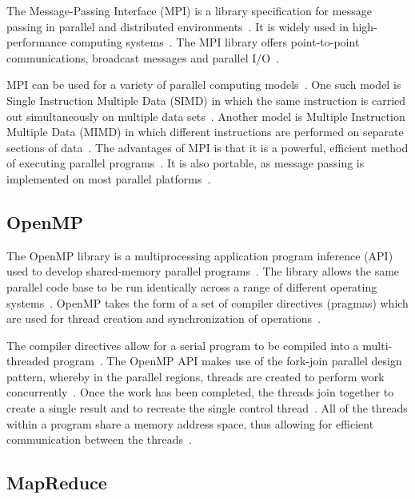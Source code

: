 \documentclass[12pt,twocolumn]{witseiepaper}
\begin{document}
The Message-Passing Interface (MPI) is a library specification for message passing in parallel and distributed environments~\cite{comparingMPIMapReduce}. It is widely used in high-performance computing systems~\cite{equijoinWithMPI, joinOnCluster}. The MPI library offers point-to-point communications, broadcast messages and parallel I/O~\cite{comparingMPIMapReduce}.

MPI can be used for a variety of parallel computing models~\cite{comparingMPIMapReduce}. One such model is Single Instruction Multiple Data (SIMD) in which the same instruction is carried out simultaneously on multiple data sets~\cite{comparingMPIMapReduce}. Another model is Multiple Instruction Multiple Data (MIMD) in which different instructions are performed on separate sections of data~\cite{comparingMPIMapReduce}. The advantages of MPI is that it is a powerful, efficient method of executing parallel programs~\cite{IBM}. It is also portable, as message passing is implemented on most parallel platforms~\cite{IBM}.

\subsection{OpenMP}

The OpenMP library is a multiprocessing application program inference (API) used to develop shared-memory parallel programs~\cite{comparingMPIMapReduce}. The library allows the same parallel code base to be run identically across a range of different operating systems~\cite{comparingMPIMapReduce}. OpenMP takes the form of a set of compiler directives (pragmas) which are used for thread creation and synchronization of operations~\cite{comparingMPIMapReduce}. 

The compiler directives allow for a serial program to be compiled into a multi-threaded program~\cite{kuhn2000openmp}. The OpenMP API makes use of the fork-join parallel design pattern, whereby in the parallel regions, threads are created to perform work concurrently~\cite{openMP}. Once the work has been completed, the threads join together to create a single result and to recreate the single control thread~\cite{openMP}. All of the threads within a program share a memory address space, thus allowing for efficient communication between the threads~\cite{comparingMPIMapReduce}. 

\subsection{MapReduce}
\end{document}
